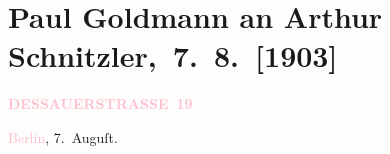 

\renewcommand{\erwaehntePersonen}{Personen: Theodore Rottenberg, Olga Schnitzler}
\renewcommand{\erwaehnteOrte}{Orte: Berlin, Dessauer Straße, Dresden, Frankgasse, Grand Hotel Wien, Podmokly, Prag, Wien}
\renewcommand{\erwaehnteWerke}{}
\section[ Paul Goldmann an Arthur Schnitzler, 7. 8. {[}1903{]}]{Paul Goldmann an Arthur Schnitzler, 7. 8. {[}1903{]}}
\nopagebreak{}
\rehead{ }\normalsize\beginnumbering{}
\toendnotes[C]{\smallbreak\pagebreak[2]}
\toendnotes[C]{\smallbreak}
\pstart
           \noindent{}\raggedleft{}{\pb}\textcolor{gray}{\textbf{\textcolor{pink}{DESSAUERSTRASSE 19}{}\ledrightnote{\textcolor{pink}{Dessauer Straße}}}}\pend
           
\pstart
           \textcolor{pink}{Berlin}{}\ledrightnote{\textcolor{pink}{Berlin}}, 7. Auguſt.\pend
           
